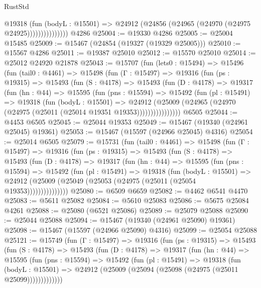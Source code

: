 \begin{lexlean}{RustStd}
\begin{coremodule}
                      @19318
                        (fun (bodyL : @15501) =>
                        @24912 (@24856 (@24965 (@24970 (@24975 @24925)))))))))))))))
    @4286
@25004 := @19330 @4286
@25005 := @25004 @15485
@25009 := @15467 (@24854 (@19327 (@19329 @25005)))
@25010 := @15567 @4286
@25011 := @19387 @25010
@25012 := @15570 @25010
@25014 := @25012 @24920 @21878
@25043 := @15707
    (fun (lets0 : @15494) =>
    @15496
      (fun (tail0 : @4461) =>
      @15498
        (fun (Γ : @15497) =>
        @19316
          (fun (ps : @19315) =>
          @15493
            (fun (S : @4178) =>
            @15493
              (fun (D : @4178) =>
              @19317
                (fun (hn : @44) =>
                @15595
                  (fun (pns : @15594) =>
                  @15492
                    (fun (pl : @15491) =>
                    @19318
                      (fun (bodyL : @15501) =>
                      @24912
                        (@25009
                          (@24965 (@24970 (@24975 (@25011 (@25014 @19351 @19353))))))))))))))))
    @6505
@25044 := @4453 @6505
@25045 := @25044 @19353
@25049 := @15467 (@19340 (@24961 @25045) @19361)
@25053 := @15467 (@15597 (@24966 @25045) @4316)
@25054 := @25014 @6505
@25079 := @15731
    (fun (tail0 : @4461) =>
    @15498
      (fun (Γ : @15497) =>
      @19316
        (fun (ps : @19315) =>
        @15493
          (fun (S : @4178) =>
          @15493
            (fun (D : @4178) =>
            @19317
              (fun (hn : @44) =>
              @15595
                (fun (pns : @15594) =>
                @15492
                  (fun (pl : @15491) =>
                  @19318
                    (fun (bodyL : @15501) =>
                    @24912 (@25009 (@25049 (@25053 (@24975 (@25011 (@25054 @19353)))))))))))))))
@25080 := @6509 @6659
@25082 := @4462 @6541 @4470
@25083 := @5611 @25082
@25084 := @5610 @25083
@25086 := @5675 @25084 @4261
@25088 := @25080 (@6521 @25086)
@25089 := @25079 @25088
@25090 := @25044 @25088
@25094 := @15467 (@19340 (@24961 @25090) @19361)
@25098 := @15467 (@15597 (@24966 @25090) @4316)
@25099 := @25054 @25088
@25121 := @15749
    (fun (Γ : @15497) =>
    @19316
      (fun (ps : @19315) =>
      @15493
        (fun (S : @4178) =>
        @15493
          (fun (D : @4178) =>
          @19317
            (fun (hn : @44) =>
            @15595
              (fun (pns : @15594) =>
              @15492
                (fun (pl : @15491) =>
                @19318
                  (fun (bodyL : @15501) =>
                  @24912 (@25009 (@25094 (@25098 (@24975 (@25011 @25099)))))))))))))

\end{coremodule}
\end{lexlean}
